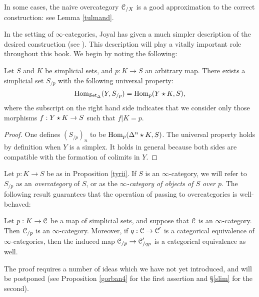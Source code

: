 \begin{1.2.9 Over- and under-categories}
\begin{remark}
In some cases, the naive overcategory $\operatorname{\mathcal{C}}_{/X}$ is a good approximation
to the correct construction: see Lemma \ref{tulmand}.
\end{remark}

In the setting of $\infty$-categories, Joyal has given a much simpler description of the desired construction (see \cite{joyalpub}). This description will play a vitally important role throughout this book. We begin by noting the following:

\begin{proposition}\label{tyrii}
Let $S$ and $K$ be simplicial sets, and $p: K \rightarrow S$ an
arbitrary map. There exists a simplicial set $S_{/p}$ with the following universal property:
$$\operatorname{Hom}_{\operatorname{\mathcal{S}et_{\Delta}}}(Y, S_{/p}) = \operatorname{Hom}_{p}( Y \star K, S),$$
where the subscript on the right hand side indicates that we
consider only those morphisms $f: Y \star K \rightarrow S$ such
that $f|K = p$.
\end{proposition}

\begin{proof}
One defines $(S_{/p})_n$ to be $\operatorname{Hom}_{p}(\Delta^n \star K, S)$.
The universal property holds by definition when $Y$ is a simplex.
It holds in general because both sides are compatible with the
formation of colimits in $Y$.
\end{proof}

Let $p: K \rightarrow S$ be as in Proposition \ref{tyrii}. If $S$ is an $\infty$-category, we will refer to $S_{/p}$ as an {\it overcategory} of $S$, or as the {\it $\infty$-category of objects of $S$ over $p$}.
The following result guarantees that the operation of passing to overcategories is well-behaved:

\begin{proposition}\label{gorban3}
Let $p: K \rightarrow \operatorname{\mathcal{C}}$ be a map of simplicial sets, and suppose
that $\operatorname{\mathcal{C}}$ is an $\infty$-category. Then $\operatorname{\mathcal{C}}_{/p}$ is an $\infty$-category.
Moreover, if $q: \operatorname{\mathcal{C}} \rightarrow \operatorname{\mathcal{C}}'$ is a categorical equivalence of
$\infty$-categories, then the induced map $\operatorname{\mathcal{C}}_{/p} \rightarrow \operatorname{\mathcal{C}}'_{/qp}$ is a categorical equivalence
as well.
\end{proposition}

The proof requires a number of ideas which we have not yet introduced, and will be postponed (see Proposition \ref{gorban4} for the first assertion and \S \ref{slim} for the second).


\end{1.2.9 Over- and under-categories}
